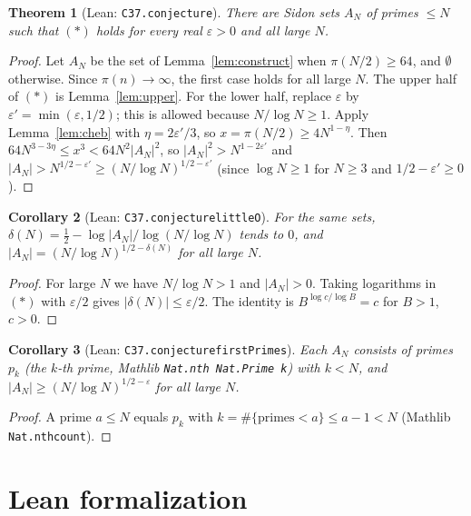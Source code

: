 \documentclass[11pt]{article}
\newtheorem{theorem}{Theorem}
\newtheorem{corollary}[theorem]{Corollary}
\theoremstyle{definition}
\theoremstyle{remark}
\renewcommand{\_}{\oldus\allowbreak}
\begin{document}
\begin{theorem}[Lean: \texttt{C37.conjecture\_37}]\label{thm:main}
There are Sidon sets $A_N$ of primes $\le N$ such that $(\ast)$ holds for every real $\varepsilon>0$ and all
large $N$.
\end{theorem}
\begin{proof}
Let $A_N$ be the set of Lemma~\ref{lem:construct} when $\pi(N/2)\ge64$, and $\emptyset$ otherwise. Since
$\pi(n)\to\infty$, the first case holds for all large $N$. The upper half of $(\ast)$ is
Lemma~\ref{lem:upper}. For the lower half, replace $\varepsilon$ by $\varepsilon'=\min(\varepsilon,1/2)$; this
is allowed because $N/\log N\ge1$. Apply Lemma~\ref{lem:cheb} with $\eta=2\varepsilon'/3$, so
$x=\pi(N/2)\ge 4N^{1-\eta}$. Then $64N^{3-3\eta}\le x^3<64N^2|A_N|^2$, so
$|A_N|^2>N^{1-2\varepsilon'}$ and $|A_N|>N^{1/2-\varepsilon'}\ge (N/\log N)^{1/2-\varepsilon'}$ (since
$\log N\ge1$ for $N\ge3$ and $1/2-\varepsilon'\ge0$).
\end{proof}

\begin{corollary}[Lean: \texttt{C37.conjecture\_37\_littleO}]
For the same sets, $\delta(N)=\tfrac12-\log|A_N|/\log(N/\log N)$ tends to $0$, and
$|A_N|=(N/\log N)^{1/2-\delta(N)}$ for all large $N$.
\end{corollary}
\begin{proof}
For large $N$ we have $N/\log N>1$ and $|A_N|>0$. Taking logarithms in $(\ast)$ with $\varepsilon/2$ gives
$|\delta(N)|\le\varepsilon/2$. The identity is $B^{\log c/\log B}=c$ for $B>1$, $c>0$.
\end{proof}

\begin{corollary}[Lean: \texttt{C37.conjecture\_37\_firstPrimes}]
Each $A_N$ consists of primes $p_k$ (the $k$-th prime, Mathlib \texttt{Nat.nth Nat.Prime k}) with $k<N$, and
$|A_N|\ge (N/\log N)^{1/2-\varepsilon}$ for all large $N$.
\end{corollary}
\begin{proof}
A prime $a\le N$ equals $p_k$ with $k=\#\{\text{primes}<a\}\le a-1<N$ (Mathlib \texttt{Nat.nth\_count}).
\end{proof}

\section{Lean formalization}
\end{document}
